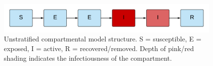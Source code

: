 
\begin{figure}[ht]
    \includegraphics[width=\textwidth]{../tex_descriptions/models/sm_sir/sm_sir_seir.pdf}
    \caption[Unstratified compartmental model structure.]{Unstratified compartmental model structure. \small S = susceptible, E = exposed, I = active, R = recovered/removed. Depth of pink/red shading indicates the infectiousness of the compartment.}
    \label{fig:seeiir}
\end{figure}
